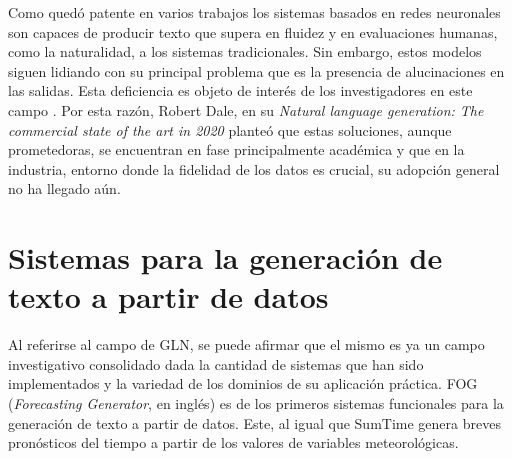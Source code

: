     Como quedó patente en varios trabajos  los sistemas basados en redes neuronales
son capaces de producir texto que supera en fluidez y en evaluaciones humanas, como la naturalidad, a los sistemas tradicionales. Sin embargo, estos modelos siguen lidiando con su principal
problema que es la presencia de alucinaciones en las salidas. Esta deficiencia es objeto de interés de los investigadores en este campo . Por esta razón, Robert Dale, 
en su \textit{Natural language generation: The commercial state of the art in 2020}  planteó que estas soluciones, aunque prometedoras, se 
encuentran en fase principalmente académica y que en la industria, entorno donde la fidelidad de los datos es crucial, su adopción general no ha llegado aún.   


\section{Sistemas para la generación de texto a partir de datos}

    Al referirse al campo de GLN, se puede afirmar que el mismo es ya un campo investigativo consolidado dada la cantidad 
de sistemas que han sido implementados y la variedad de los dominios de su aplicación práctica. FOG (\emph{Forecasting Generator}, en inglés)  es 
de los primeros sistemas funcionales para la generación de texto a partir de datos. Este, al igual que SumTime  genera breves pronósticos del tiempo
a partir de los valores de variables meteorológicas. 

